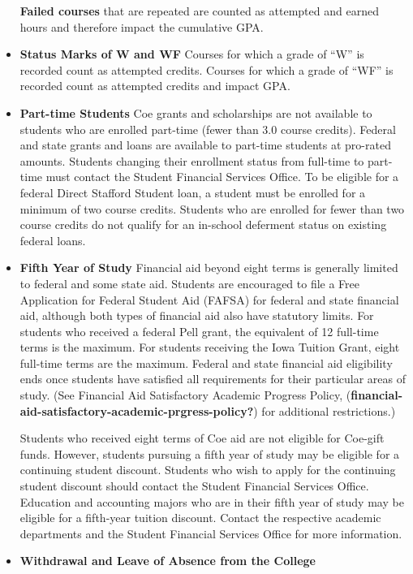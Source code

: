 \documentclass[
  letterpaper,
]{scrbook}
\begin{document}
\begin{itemize}
  \textbf{Failed courses} that are repeated are counted as attempted and
  earned hours and therefore impact the cumulative GPA.
\item
  \textbf{Status Marks of W and WF} Courses for which a grade of ``W''
  is recorded count as attempted credits. Courses for which a grade of
  ``WF'' is recorded count as attempted credits and impact GPA.
\item
  \textbf{Part-time Students} Coe grants and scholarships are not
  available to students who are enrolled part-time (fewer than 3.0
  course credits). Federal and state grants and loans are available to
  part-time students at pro-rated amounts. Students changing their
  enrollment status from full-time to part-time must contact the Student
  Financial Services Office. To be eligible for a federal Direct
  Stafford Student loan, a student must be enrolled for a minimum of two
  course credits. Students who are enrolled for fewer than two course
  credits do not qualify for an in-school deferment status on existing
  federal loans.
\item
  \textbf{Fifth Year of Study} Financial aid beyond eight terms is
  generally limited to federal and some state aid. Students are
  encouraged to file a Free Application for Federal Student Aid (FAFSA)
  for federal and state financial aid, although both types of financial
  aid also have statutory limits. For students who received a federal
  Pell grant, the equivalent of 12 full-time terms is the maximum. For
  students receiving the Iowa Tuition Grant, eight full-time terms are
  the maximum. Federal and state financial aid eligibility ends once
  students have satisfied all requirements for their particular areas of
  study. (See Financial Aid Satisfactory Academic Progress Policy,
  (\textbf{financial-aid-satisfactory-academic-prgress-policy?}) for
  additional restrictions.)

  Students who received eight terms of Coe aid are not eligible for
  Coe-gift funds. However, students pursuing a fifth year of study may
  be eligible for a continuing student discount. Students who wish to
  apply for the continuing student discount should contact the Student
  Financial Services Office. Education and accounting majors who are in
  their fifth year of study may be eligible for a fifth-year tuition
  discount. Contact the respective academic departments and the Student
  Financial Services Office for more information.
\item
  \textbf{Withdrawal and Leave of Absence from the College}
\end{itemize}
\end{document}
